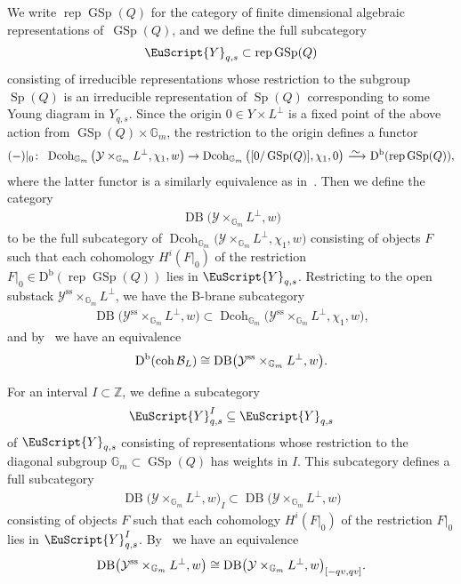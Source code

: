 \documentclass[10pt,a4paper]{amsart}
\numberwithin{equation}{section}
\newcommand{\Dcoh}{\operatorname{Dcoh}}
\newcommand{\coh}{\operatorname{coh}}
\newcommand{\Db}{\operatorname{D^b}}
\newcommand{\Sp}{\operatorname{Sp}}
\newcommand{\GSp}{\operatorname{GSp}}
\newcommand{\stab}{\operatorname{ss}}
\newcommand{\DB}{\operatorname{DB}}
\newcommand{\rep}{\operatorname{rep}}
\newcommand{\cB}{\mathcal{B}}
\newcommand{\cY}{\mathcal{Y}}
\newcommand{\bG}{\mathbb{G}}
\newcommand{\bZ}{\mathbb{Z}}
\newcommand{\scrY}{\EuScript{Y}}
\newcommand{\simto}{\,\,\,\,\raisebox{4pt}{$\sim$}{\kern -1.1em \longrightarrow}\,}
\begin{document}
 {\sloppy
 We write $\rep\GSp(Q)$ for the category of finite dimensional algebraic representations of~$\GSp(Q)$, and we define the full subcategory
\begin{gather*}
\scrY_{q,s}\subset \rep\GSp(Q)
\end{gather*}}\noindent
consisting of irreducible representations whose restriction to the subgroup $\Sp(Q)$ is an irreducible representation of $\Sp(Q)$ corresponding to some Young diagram in $Y_{q,s}$.
Since the origin $0\in Y\times L^{\perp}$ is a fixed point of the above action from $\GSp(Q)\times \bG_m$, the restriction to the origin defines a functor
\begin{gather*}
(-)|_0\colon\ \Dcoh_{\bG_m}\big(\cY\times_{\bG_m}L^{\perp},\chi_1,w\big)\to \Dcoh_{\bG_m}\big([0/\GSp(Q)],\chi_1,0\big)\simto\Db(\rep\GSp(Q)),
\end{gather*}
where the latter functor is a similarly equivalence as in~\cite[Proposition~2.14]{H2}.
Then we define the category
\begin{gather*}
\DB\big(\cY\times_{\bG_m}L^{\perp},w\big)
\end{gather*}
 to be the full subcategory of $\Dcoh_{\bG_m}\big(\cY\times_{\bG_m}L^{\perp},\chi_1,w\big)$ consisting of objects $F$ such that each cohomology $H^i(F|_0)$ of the restriction $F|_0\in \Db(\rep\GSp(Q))$ lies in $\scrY_{q,s}$. Restricting to the open substack $\cY^{\stab}\times_{\bG_m}L^{\perp}$, we have the B-brane subcategory
 \begin{gather*}
 \DB\big(\cY^{\stab}\times_{\bG_m}L^{\perp},w\big)\subset \Dcoh_{\bG_m}\big(\cY^{\stab}\times_{\bG_m}L^{\perp},\chi_1,w\big),
 \end{gather*}
 and by~\cite[Section~4.1]{rs} we have an equivalence
\begin{equation}\label{nc br}
\Db(\coh \cB_L)\cong {\rm DB}\big(\cY^{\rm ss}\times_{\bG_m}L^{\perp},w\big).
\end{equation}

For an interval $I\subset \bZ$, we define a subcategory
\begin{gather*}
\scrY_{q,s}^I\subseteq \scrY_{q,s}
\end{gather*}
of $\scrY_{q,s}$ consisting of representations whose restriction to the diagonal subgroup $\bG_m\subset \GSp(Q)$ has weights in $I$. This subcategory defines a full subcategory
\begin{gather*}
\DB\big(\cY\times_{\bG_m}L^{\perp},w\big)_I\subset\DB\big(\cY\times_{\bG_m}L^{\perp},w\big)
\end{gather*}
consisting of objects $F$ such that each cohomology $H^i(F|_0)$ of the restriction $F|_0$ lies in $\scrY_{q,s}^I$.
By~\cite[Theorem~4.7]{rs} we have an equivalence
\begin{equation}\label{window}
{\rm DB}\big(\cY^{\rm ss}\times_{\bG_m}L^{\perp},w\big)\cong {\rm DB}\big(\cY\times_{\bG_m}L^{\perp},w\big)_{[-qv,qv]}.
\end{equation}
\end{document}
